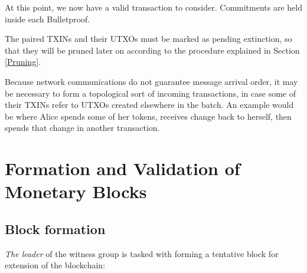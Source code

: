 \documentclass[8pt,fleqn,openany]{book}
\begin{document}
At this point, we now have a valid transaction to consider. Commitments are held inside each Bulletproof.

The paired TXINs and their UTXOs must be marked as pending extinction, so that they will be pruned later on according to the procedure explained in Section \ref{Pruning}.

Because network communications do not guarantee message arrival order, it may be necessary to form a topological sort of incoming transactions, in case some of their TXINs refer to UTXOs created elsewhere in the batch. An example would be where Alice spends some of her tokens, receives change back to herself, then spends that change in another transaction.

\section{Formation and Validation of Monetary Blocks}

\subsection{Block formation} \textit{The leader} of the witness group is tasked with forming a tentative block for extension of the blockchain:
\end{document}
